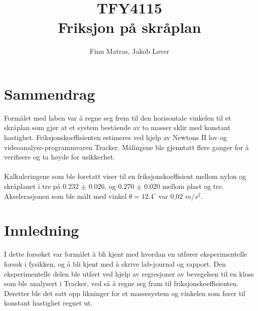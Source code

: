 \documentclass[10pt,a4paper]{report}
\author{Finn Matras, Jakob Løver}
\title{{\LARGE TFY4115}\\{\large Friksjon på skråplan}}
\begin{document}
\renewcommand{\contentsname}{Innhold}
\renewcommand{\cftchapleader}{\cftdotfill{\cftdotsep}}
\renewcommand{\cftpartleader}{\cftdotfill{\cftdotsep}}

\maketitle
\tableofcontents

\chapter*{Sammendrag}
Formålet med laben var å regne seg frem til den horisontale vinkelen til et skråplan som gjør at et system bestående av to masser sklir med konstant hastighet. Friksjonskoeffisienten estimeres ved hjelp av Newtons II lov og videoanalyse-programmvaren Tracker. Målingene ble gjenntatt flere ganger for å verifisere og ta høyde for usikkerhet.\\
\\Kalkuleringene som ble foretatt viser til en friksjonskoeffisient mellom nylon og skråplanet i tre på 0.232 $\pm$ $0.026$, og 0.270 $\pm$ $0.020$ mellom plast og tre. Akselerasjonen som ble målt med vinkel $\theta = 12.4 ^{\circ}$ var 0,02 $m/s^2$.

{\let\clearpage\relax\chapter*{Innledning}}
I dette forsøket var formålet å bli kjent med hvordan en utfører eksperimentelle forsøk i fysikken, og å bli kjent med å skrive lab-journal og rapport. Den eksperimentelle delen ble utført ved hjelp av regresjoner av bevegelsen til en kloss som ble analysert i Tracker, ved så å regne seg fram til friksjonskoeffisienten. Deretter ble det satt opp likninger for et massesystem og vinkelen som fører til konstant hastighet regnet ut.
\end{document}

